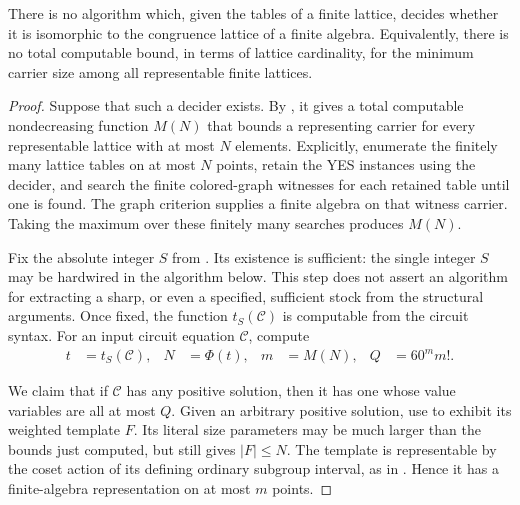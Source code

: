 \begin{theorem}
\label{n:undecidable}
There is no algorithm which, given the tables of a finite
lattice, decides whether it is isomorphic to the congruence
lattice of a finite algebra.  Equivalently, there is no
total computable bound, in terms of lattice cardinality,
for the minimum carrier size among all representable
finite lattices.
\end{theorem}

\begin{proof}
Suppose that such a decider exists.  By
, it gives a total computable
nondecreasing function $M(N)$ that bounds a representing
carrier for every representable lattice with at most
$N$ elements.  Explicitly, enumerate the finitely many
lattice tables on at most $N$ points, retain the YES
instances using the decider, and search the finite
colored-graph witnesses for each retained table until
one is found.  The graph criterion supplies a finite
algebra on that witness carrier.  Taking the maximum
over these finitely many searches produces $M(N)$.

Fix the absolute integer $S$ from .
Its existence is sufficient: the single integer $S$
may be hardwired in the algorithm below.  This step
does not assert an algorithm for extracting a sharp,
or even a specified, sufficient stock from the
structural arguments.  Once fixed, the function
$t_S(\mathcal C)$ is computable from the circuit syntax.
For an input circuit equation $\mathcal C$, compute
\begin{equation}\label{n:computable-witness-bound}
 \begin{aligned}
  t&=t_S(\mathcal C),&
  N&=\Phi(t),&
  m&=M(N),&
  Q&=60^m m!.
 \end{aligned}
\end{equation}

We claim that if $\mathcal C$ has any positive solution,
then it has one whose value variables are all at most
$Q$.  Given an arbitrary positive solution, use
 to exhibit its weighted
template $F$.  Its literal size parameters may be much
larger than the bounds just computed, but
 still gives $|F|\le N$.
The template is representable by the coset action of
its defining ordinary subgroup interval, as in
.  Hence it has a finite-algebra
representation on at most $m$ points.


\end{proof}
